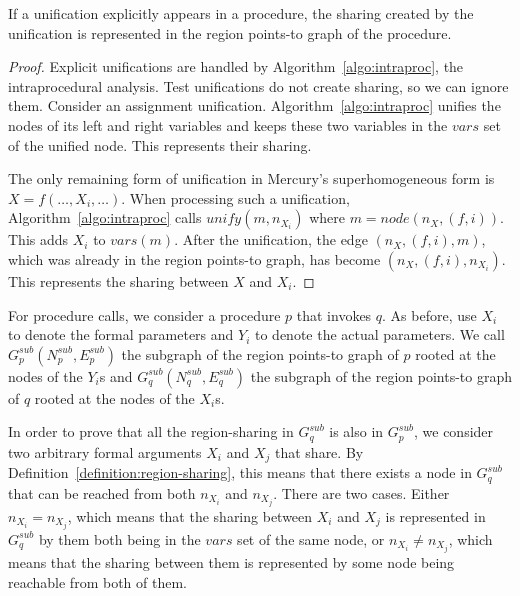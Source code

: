 \documentclass{tlp}
\def\varset{\mathit{vars}}
\newcommand{\vars}[1]{\ensuremath{\mathit{vars}(#1)}}
\begin{document}
\begin{lemma}
\label{lemma:sharing_unifs}
    If a unification explicitly appears in a procedure,
    the sharing created by the unification
    is represented in the region points-to graph of the procedure.
\end{lemma}
\begin{proof}
Explicit unifications are handled by Algorithm~\ref{algo:intraproc},
the intraprocedural analysis.
Test unifications do not create sharing, so we can ignore them.
Consider an assignment unification.
Algorithm~\ref{algo:intraproc} unifies
the nodes of its left and right variables and keeps
these two variables in the $\varset$ set of the unified node.
This represents their sharing.

The only remaining form of unification in Mercury's superhomogeneous form
is $X=f(\ldots,X_i,\ldots)$.
When processing such a unification,
Algorithm~\ref{algo:intraproc} calls $\mathit{unify}(m, n_{X_i})$
where $m = \mathit{node}(n_X, (f, i))$.
This adds $X_i$ to $\vars{m}$.
After the unification, the edge $(n_X,(f,i),m)$,
which was already in the region points-to graph,
has become $(n_X,(f,i),n_{X_i})$.
This represents the sharing between $X$ and $X_i$.
\end{proof}

For procedure calls, we consider a procedure $p$ that invokes $q$.
As before, use $X_i$ to denote the formal parameters
and $Y_i$ to denote the actual parameters.
We call
$G^{sub}_p(N^{sub}_p,E^{sub}_p)$ the subgraph
of the region points-to graph of $p$ rooted at the nodes of the $Y_i$s and
$G^{sub}_q(N^{sub}_q,E^{sub}_q)$ the subgraph
of the region points-to graph of $q$ rooted at the nodes of the $X_i$s.

In order to prove that
all the region-sharing in $G^{sub}_q$ is also in $G^{sub}_p$,
we consider two arbitrary formal arguments $X_i$ and $X_j$ that share.
By Definition~\ref{definition:region-sharing},
this means that there exists a node in $G^{sub}_q$
that can be reached from both $n_{X_i}$ and $n_{X_j}$.
There are two cases.
Either $n_{X_i}=n_{X_j}$, which means that
the sharing between $X_i$ and $X_j$ is represented in $G^{sub}_q$
by them both being in the $\varset$ set of the same node,
or $n_{X_i} \not= n_{X_j}$,
which means that the sharing between them
is represented by some node being reachable from both of them.
\end{document}
